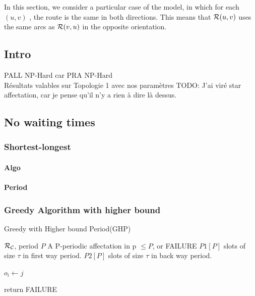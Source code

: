 \documentclass[a4paper,10pt]{article}
\newcommand{\todo}[1]{{\color{red} TODO: {#1}}}
\begin{document}
  In this section, we consider a particular case of the model, in which for each $(u,v)$ , the route is the same in both directions. This means that ${\cal R}(u,v)$ uses the same arcs as ${\cal R}(v,u)$ in the opposite orientation.
  \subsection{Intro}
    PALL NP-Hard car PRA NP-Hard\\
    Résultats valables sur Topologie 1 avec nos paramètres
    \todo{J'ai viré star affectation, car je pense qu'il n'y a rien à dire là dessus.}
    
  \subsection{No waiting times}
    \subsubsection{Shortest-longest}
      \paragraph{Algo}
      \paragraph{Period}
    \subsubsection{Greedy Algorithm with higher bound}
   
	\begin{algorithm}[H]
	\caption{Greedy with Higher bound Period(GHP)}
	\begin{algorithmic}
	\REQUIRE ${\cal R}_{\cal C}$, period $P$
	\ENSURE A P-periodic affectation in p $\leq P$, or FAILURE
	\STATE $P1[P]$ slots of size $\tau$ in first way period.
	\STATE $P2[P]$ slots  of size $\tau$ in back way period.



	
	\STATE $o_i \leftarrow j$
	\ENDIF


	\STATE return FAILURE
	\ENDIF
	\ENDFOR

	\ENDFOR

	\end{algorithmic}
	\end{algorithm}
\end{document}

